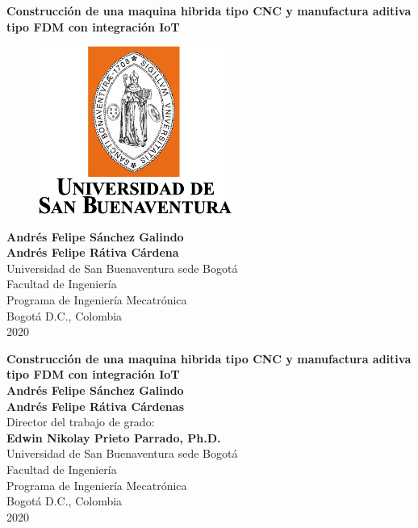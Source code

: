 \cleardoublepage

\thispagestyle{empty} 
\begin{center}
\textbf{ 
\huge{Construcción de una maquina hibrida tipo CNC y manufactura aditiva tipo FDM con integración IoT}}\\[1.0cm]


\begin{figure}[htbp]
	\centering
		\includegraphics[height=5.5cm,keepaspectratio]{OtrosTex/LogoUSB}
\end{figure}

\vspace*{2.5cm} 
\Large\textbf{Andrés Felipe Sánchez Galindo \\ Andrés Felipe Rátiva Cárdena }\\[1.0cm]

\vspace*{2cm} 
\Large{Universidad de San Buenaventura sede Bogotá}\\
\Large{Facultad de Ingeniería}\\
\Large{Programa de Ingeniería Mecatrónica}\\
\large{Bogotá D.C., Colombia\\
2020}\\
\end{center}

\newpage{\pagestyle{empty}\cleardoublepage}
\newpage

\begin{center}
\thispagestyle{empty} \vspace*{0cm} \textbf{\huge
Construcción de una maquina hibrida tipo CNC y manufactura aditiva tipo FDM con integración IoT}\\[2cm]
\vspace*{1cm}
\Large\textbf{Andrés Felipe Sánchez Galindo \\ Andrés Felipe Rátiva Cárdenas }\\[2.5cm]
\large{Director del trabajo de grado:}\\%
\large\textbf{Edwin Nikolay Prieto Parrado, Ph.D.}\\[1.5cm]



\vspace*{2.5cm}
\Large{Universidad de San Buenaventura sede Bogotá}\\
\Large{Facultad de Ingeniería}\\
\Large{Programa de Ingeniería Mecatrónica}\\
\large{Bogotá D.C., Colombia\\
2020}\\
\end{center}


%
